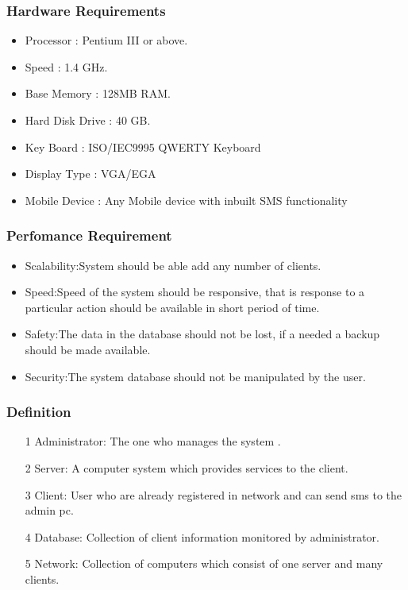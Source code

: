     \subsubsection{Hardware Requirements}
     \begin{itemize}
      \item Processor : Pentium III or above.
      \item Speed : 1.4 GHz.
      \item Base Memory : 128MB RAM.
      \item Hard Disk Drive : 40 GB.
      \item Key Board : ISO/IEC9995 QWERTY Keyboard
      \item Display Type : VGA/EGA
      \item Mobile Device : Any Mobile device with inbuilt SMS functionality
     \end{itemize}
     \subsubsection{Perfomance Requirement}
     \begin{itemize}
     
     
     \item Scalability:System should be able add any number of clients.
     \item Speed:Speed of the system should be responsive, that is response to a particular
action should be available in short period of time.
     \item Safety:The data in the database should not be lost, if a needed a backup should be
made available.
     \item Security:The system database should not be manipulated by the user.
     \end{itemize}
     \subsubsection{Definition}
     \begin{itemize}
     
     
     \item[1] Administrator: The one who manages the system .
     \item[2] Server: A computer system which provides services to the client.
     \item[3] Client: User who are already registered in network and can send sms to the admin pc.
     \item[4] Database: Collection of client information monitored by administrator.
     \item[5] Network: Collection of computers which consist of one server and many clients.
     \end{itemize}
